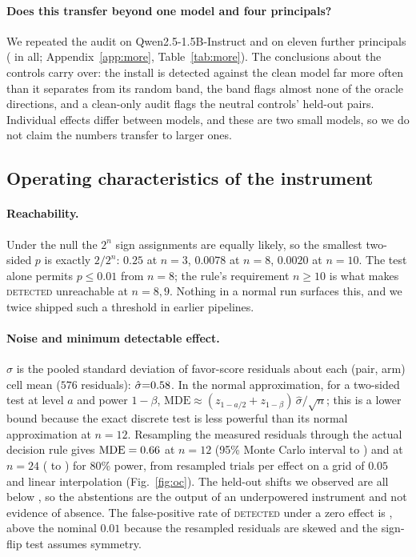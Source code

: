 \documentclass{article}
\begin{document}
\paragraph{Does this transfer beyond one model and four principals?}
We repeated the audit on Qwen2.5-1.5B-Instruct and on eleven further principals (\nPrincipalsA{} in all; Appendix~\ref{app:more}, Table~\ref{tab:more}). The conclusions about the controls carry over: the install is detected against the clean model far more often than it separates from its random band, the band flags almost none of the oracle directions, and a clean-only audit flags the neutral controls' held-out pairs. Individual effects differ between models, and these are two small models, so we do not claim the numbers transfer to larger ones.

\subsection*{Operating characteristics of the instrument}

\paragraph{Reachability.} Under the null the $2^n$ sign assignments are equally likely, so the smallest two-sided $p$ is exactly $2/2^n$: $0.25$ at
$n{=}3$, $0.0078$ at $n{=}8$, $0.0020$ at $n{=}10$. The test alone permits $p\le0.01$ from $n{=}8$; the rule's requirement $n\ge10$ is what makes
\textsc{detected} unreachable at $n{=}8,9$. Nothing in a normal run surfaces this, and we twice shipped such a threshold in earlier pipelines.

\paragraph{Noise and minimum detectable effect.} $\hat\sigma$ is the pooled standard deviation of favor-score residuals about each (pair, arm)
cell mean ($576$ residuals): $\hat\sigma{=}0.58$. In the normal approximation, for a two-sided test at level $a$ and power $1-\beta$,
$\mathrm{MDE}\approx(z_{1-a/2}+z_{1-\beta})\,\hat\sigma/\sqrt n$; this is a lower bound because the exact discrete test is less powerful than its
normal approximation at $n{=}12$. Resampling the measured residuals through the actual decision rule gives $\mathrm{MDE}=0.66$ at
$n{=}12$ (95\% Monte Carlo interval \mdeTwelveLoA{} to \mdeTwelveHiA) and \mdeTwentyFourA{} at $n{=}24$ (\mdeTwentyFourLoA{} to \mdeTwentyFourHiA) for 80\% power, from \nTrialsA{} resampled trials per effect on a grid of $0.05$ and linear interpolation (Fig.~\ref{fig:oc}). The held-out shifts we observed are
all below \mdeTwelveA{}, so the abstentions are the output of an underpowered instrument and not evidence of absence. The false-positive rate of
\textsc{detected} under a zero effect is \fprNullA{}, above the nominal $0.01$ because the resampled residuals are skewed and the sign-flip test
assumes symmetry.
\end{document}
